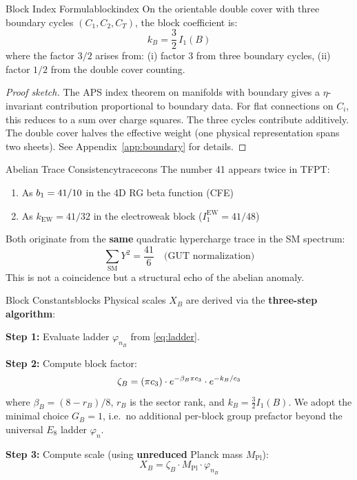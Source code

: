 \begin{theorem}{Block Index Formula}{blockindex}
On the orientable double cover with three boundary cycles $(C_1, C_2, C_T)$, 
the block coefficient is:
\begin{equation}
    k_B = \frac{3}{2}\, I_1(B)
\end{equation}
where the factor $3/2$ arises from: (i) factor 3 from three boundary cycles, 
(ii) factor $1/2$ from the double cover counting.
\end{theorem}

\begin{proof}[Proof sketch]
The APS index theorem on manifolds with boundary gives a $\eta$-invariant 
contribution proportional to boundary data. For flat connections on $C_i$, 
this reduces to a sum over charge squares. The three cycles contribute 
additively. The double cover halves the effective weight (one physical 
representation spans two sheets). See Appendix~\ref{app:boundary} for details.
\end{proof}

\begin{corollary}{Abelian Trace Consistency}{tracecons}
The number 41 appears twice in TFPT:
\begin{enumerate}[leftmargin=1.5em, topsep=2pt, itemsep=1pt]
    \item As $b_1 = 41/10$ in the 4D RG beta function (CFE)
    \item As $k_{\text{EW}} = 41/32$ in the electroweak block ($I_1^{\text{EW}} = 41/48$)
\end{enumerate}
Both originate from the \textbf{same} quadratic hypercharge trace in the SM spectrum:
\begin{equation}
    \sum_{\text{SM}} Y^2 = \frac{41}{6} \quad \text{(GUT normalization)}
\end{equation}
This is not a coincidence but a structural echo of the abelian anomaly.
\end{corollary}

\begin{definition}{Block Constants}{blocks}
Physical scales $X_B$ are derived via the \textbf{three-step algorithm}:

\textbf{Step 1:} Evaluate ladder $\varphi_{n_B}$ from \eqref{eq:ladder}.

\textbf{Step 2:} Compute block factor:
\begin{equation}
    \zeta_B = (\pi c_3) \cdot e^{-\beta_B\pi c_3} 
        \cdot e^{-k_B/c_3}
\end{equation}
where $\beta_B = (8 - r_B)/8$, $r_B$ is the sector rank, and $k_B = \frac{3}{2}I_1(B)$.
We adopt the minimal choice $G_B=1$, i.e.\ no additional per-block group prefactor beyond the universal $E_8$ ladder $\varphi_n$.

\textbf{Step 3:} Compute scale (using \textbf{unreduced} Planck mass $M_{\mathrm{Pl}}$):
\begin{equation}
    X_B = \zeta_B \cdot M_{\mathrm{Pl}} \cdot \varphi_{n_B}
\end{equation}
\end{definition}

